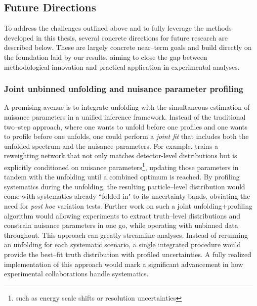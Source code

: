         \subsection{Future Directions}
            To address the challenges outlined above and to fully leverage the methods developed in this thesis, several concrete directions for future research are described below.
            These are largely concrete near--term goals and build directly on the foundation laid by our results, aiming to close the gap between methodological innovation and practical application in experimental analyses.

            \subsubsection{Joint unbinned unfolding and nuisance parameter profiling}
                A promising avenue is to integrate unfolding with the simultaneous estimation of nuisance parameters in a unified inference framework.
                Instead of the traditional two--step approach, where one wants to unfold before one profiles and one wants to profile before one unfolds, one could perform a \emph{joint fit} that includes both the unfolded spectrum and the nuisance parameters.
                For example,  trains a reweighting network that not only matches detector-level distributions but is explicitly conditioned on nuisance parameters\footnote{such as energy scale shifts or resolution uncertainties}, updating those parameters in tandem with the unfolding until a combined optimum is reached.
                By profiling systematics during the unfolding, the resulting particle--level distribution would come with systematics already ``folded in" to its uncertainty bands, obviating the need for \textit{post hoc} variation tests.
                Further work on such a joint unfolding+profiling algorithm would allowing experiments to extract truth--level distributions and constrain nuisance parameters in one go, while operating with unbinned data throughout.
                This approach can greatly streamline analyses.
                Instead of rerunning an unfolding for each systematic scenario, a single integrated procedure would provide the best--fit truth distribution with profiled uncertainties.
                A fully realized implementation of this approach would mark a significant advancement in how experimental collaborations handle systematics.
